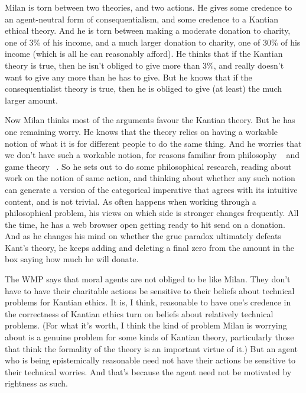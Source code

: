 \gls{Milan} is torn between two theories, and two actions. He gives some credence to an agent-neutral form of consequentialism, and some credence to a Kantian ethical theory. And he is torn between making a moderate donation to charity, one of 3\% of his income, and a much larger donation to charity, one of 30\% of his income (which is all he can reasonably afford). He thinks that if the Kantian theory is true, then he isn't obliged to give more than 3\%, and really doesn't want to give any more than he has to give. But he knows that if the consequentialist theory is true, then he is obliged to give (at least) the much larger amount.

Now \gls{Milan} thinks most of the arguments favour the Kantian theory. But he has one remaining worry. He knows that the theory relies on having a workable notion of what it is for different people to do the same thing. And he worries that we don't have such a workable notion, for reasons familiar from philosophy ~\citep{Goodman1955} and game theory ~\citep{ChoKreps1987}. So he sets out to do some philosophical research, reading about work on the notion of same action, and thinking about whether any such notion can generate a version of the categorical imperative that agrees with its intuitive content, and is not trivial. As often happens when working through a philosophical problem, his views on which side is stronger changes frequently. All the time, he has a web browser open getting ready to hit send on a donation. And as he changes his mind on whether the grue paradox ultimately defeats Kant's theory, he keeps adding and deleting a final zero from the amount in the box saying how much he will donate.

The WMP says that moral agents are not obliged to be like \gls{Milan}. They don't have to have their charitable actions be sensitive to their beliefs about technical problems for Kantian ethics. It is, I think, reasonable to have one's credence in the correctness of Kantian ethics turn on beliefs about relatively technical problems. (For what it's worth, I think the kind of problem Milan is worrying about is a genuine problem for some kinds of Kantian theory, particularly those that think the formality of the theory is an important virtue of it.) But an agent who is being epistemically reasonable need not have their actions be sensitive to their technical worries. And that's because the agent need not be motivated by rightness as such.

